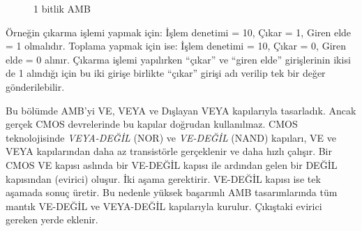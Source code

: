 \begin{figure}[htbp]
\caption{1 bitlik AMB}
\label{fig:1bit-amb}
\end{figure}

Örneğin çıkarma işlemi yapmak için: İşlem denetimi = 10, Çıkar = 1, Giren elde = 1 olmalıdır. Toplama yapmak için ise: İşlem denetimi = 10, Çıkar = 0, Giren elde = 0 alınır. Çıkarma işlemi yapılırken ``çıkar'' ve ``giren elde'' girişlerinin ikisi de 1 alındığı için bu iki girişe birlikte ``çıkar'' girişi adı verilip tek bir değer gönderilebilir.

\begin{bilginot}
Bu bölümde AMB'yi VE, VEYA ve Dışlayan VEYA kapılarıyla tasarladık. Ancak gerçek CMOS devrelerinde bu kapılar doğrudan kullanılmaz. CMOS teknolojisinde \emph{VEYA-DEĞİL} (NOR) ve \emph{VE-DEĞİL} (NAND) kapıları, VE ve VEYA kapılarından daha az transistörle gerçeklenir ve daha hızlı çalışır. Bir CMOS VE kapısı aslında bir VE-DEĞİL kapısı ile ardından gelen bir DEĞİL kapısından (evirici) oluşur. İki aşama gerektirir. VE-DEĞİL kapısı ise tek aşamada sonuç üretir. Bu nedenle yüksek başarımlı AMB tasarımlarında tüm mantık VE-DEĞİL ve VEYA-DEĞİL kapılarıyla kurulur. Çıkıştaki evirici gereken yerde eklenir.
\end{bilginot}

